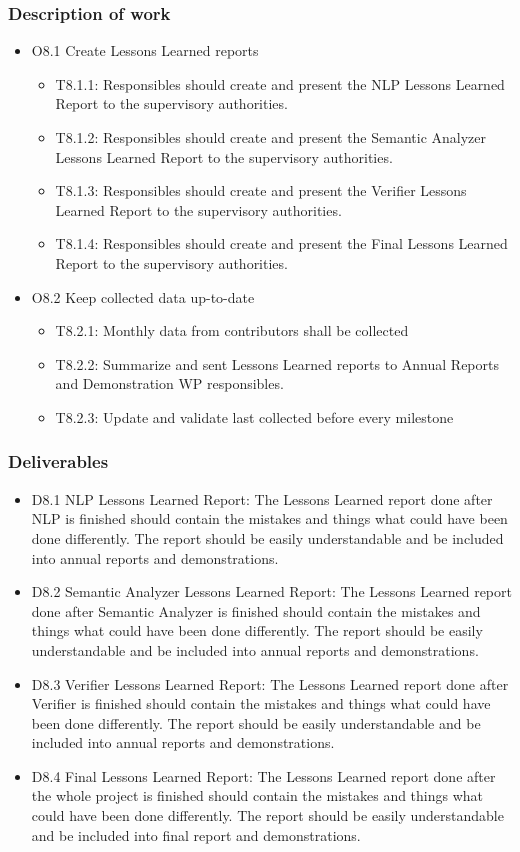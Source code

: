 \subsubsection{Description of work}
\begin{itemize}
	\item O8.1 Create Lessons Learned reports
	\begin{itemize}
		\item T8.1.1: Responsibles should create and present the \gls{NLP} Lessons Learned Report to the supervisory authorities.   
		\item T8.1.2: Responsibles should create and present the Semantic Analyzer Lessons Learned Report to the supervisory authorities.
		\item T8.1.3: Responsibles should create and present the Verifier Lessons Learned Report to the supervisory authorities.
		\item T8.1.4: Responsibles should create and present the Final Lessons Learned Report to the supervisory authorities.
	\end{itemize}
	\item O8.2 Keep collected data up-to-date
	\begin{itemize}
		\item T8.2.1: Monthly data from contributors shall be collected
		\item T8.2.2: Summarize and sent Lessons Learned reports to Annual Reports and Demonstration WP responsibles.
		\item T8.2.3: Update and validate last collected before every milestone  
	\end{itemize}
\end{itemize}

\subsubsection{Deliverables}
\begin{itemize}
	\item D8.1 \gls{NLP} Lessons Learned Report: The Lessons Learned report done after \gls{NLP} is finished should contain the mistakes and things what could have been done differently. The report should be easily understandable and be included into annual reports and demonstrations.
	\item D8.2 Semantic Analyzer Lessons Learned Report: The Lessons Learned report done after Semantic Analyzer is finished should contain the mistakes and things what could have been done differently. The report should be easily understandable and be included into annual reports and demonstrations.
	\item D8.3 Verifier Lessons Learned Report: The Lessons Learned report done after Verifier is finished should contain the mistakes and things what could have been done differently. The report should be easily understandable and be included into annual reports and demonstrations.
	\item D8.4 Final Lessons Learned Report: The Lessons Learned report done after the whole project is finished should contain the mistakes and things what could have been done differently. The report should be easily understandable and be included into final report and demonstrations.
\end{itemize}